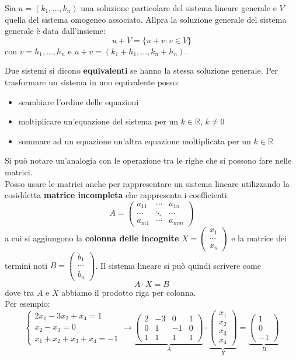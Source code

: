 \documentclass[a4paper,12pt, oneside]{book}
\begin{document}
\begin{teorema}
	Sia $u=(k_1,...,k_n)$ una soluzione particolare del sistema lineare generale e $V$ quella del sistema omogeneo associato. Allpra la soluzione generale del sistema generale è data dall'insieme:
	$$u+V=\{u+v:v\in V\}$$
	con $v=h_1,...,h_n$ e $u+v=(k_1+h_1,...,k_n+h_n)$.
\end{teorema}
Due sistemi si dicono \textbf{equivalenti} se hanno la stessa soluzione generale. Per trasformare un sistema in uno equivalente posso:
\begin{itemize}
	\item scambiare l'ordine delle equazioni
	\item moltiplicare un'equazione del sistema per un $k\in \mathbb{R},\, k\neq 0$
	\item sommare ad un equazione un'altra equazione moltiplicata per un $k\in \mathbb{R}$
\end{itemize}
Si può notare un'analogia con le operazione tra le righe che si possono fare nelle matrici. \\
Posso usare le matrici anche per rappresentare un sistema lineare utilizzando la cosiddetta \textbf{matrice incompleta} che rappresenta i coefficienti: $$
	A=\left(\begin{matrix}
			a_{11} & \cdots & a_{1n} \\
			\cdots & \ddots & \cdots \\
			a_{m1} & \cdots & a_{mm}
		\end{matrix}\right)
$$ a cui si aggiungono la \textbf{colonna delle incognite} $
	X=\left(\begin{matrix}
			x_1    \\
			\cdots \\
			x_n
		\end{matrix}\right)
$ e la matrice dei termini noti $
	B=\left(\begin{matrix}
			b_1    \\
			\cdots \\
			b_n
		\end{matrix}\right)
$.
Il sistema lineare si può quindi scrivere come $$A\cdot X=B$$
dove tra $A$ e $X$ abbiamo il prodotto riga per colonna.\\
Per esempio:
$$
	\begin{cases}
		2x_1-3x_2+x_4=1 \\
		x_2-x_3=0       \\
		x_1+x_2+x_3+x_4=-1
	\end{cases}\rightarrow
	\underbrace{\left(\begin{matrix}
			2 & -3 & 0  & 1 \\
			0 & 1  & -1 & 0 \\
			1 & 1  & 1  & 1
		\end{matrix}\right)}_{A}\cdot
	\underbrace{\left(\begin{matrix}
			x_1 \\
			x_2 \\
			x_3 \\
			x_4
		\end{matrix}\right)}_{X}=
	\underbrace{\left(\begin{matrix}
			1 \\
			0 \\
			-1
		\end{matrix}\right)}_{B}
$$
\end{document}
